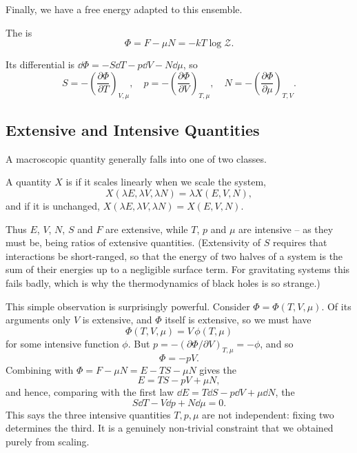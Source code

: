 \documentclass[a4paper]{scrartcl}
\begin{document}
Finally, we have a free energy adapted to this ensemble.

\begin{definition}
	The  is
	$$
	\Phi = F - \mu N = -kT\log\mathcal Z.
	$$
\end{definition}

Its differential is $\dd\Phi = -S\dd T - p\dd V - N\dd\mu$, so
$$
S = -\left(\frac{\partial\Phi}{\partial T}\right)_{V,\mu},\quad p = -\left(\frac{\partial \Phi}{\partial V}\right)_{T,\mu}, \quad N = -\left(\frac{\partial\Phi}{\partial\mu}\right)_{T,V}.
$$

\subsection{Extensive and Intensive Quantities}

A macroscopic quantity generally falls into one of two classes.

\begin{definition}
	A quantity $X$ is  if it scales linearly when we scale the system,
	$$
	X(\lambda E, \lambda V, \lambda N) = \lambda X(E,V,N),
	$$
	and  if it is unchanged, $X(\lambda E, \lambda V, \lambda N) = X(E,V,N)$.
\end{definition}

Thus $E$, $V$, $N$, $S$ and $F$ are extensive, while $T$, $p$ and $\mu$ are intensive -- as they must be, being ratios of extensive quantities. (Extensivity of $S$ requires that interactions be short-ranged, so that the energy of two halves of a system is the sum of their energies up to a negligible surface term. For gravitating systems this fails badly, which is why the thermodynamics of black holes is so strange.)

This simple observation is surprisingly powerful. Consider $\Phi = \Phi(T,V,\mu)$. Of its arguments only $V$ is extensive, and $\Phi$ itself is extensive, so we must have
$$
\Phi(T,V,\mu) = V \, \phi(T,\mu)
$$
for some intensive function $\phi$. But $p = -(\partial \Phi/\partial V)_{T,\mu} = -\phi$, and so
$$
\Phi = -pV.
$$
Combining with $\Phi = F - \mu N = E - TS - \mu N$ gives the 
$$
E = TS - pV + \mu N,
$$
and hence, comparing with the first law $\dd E = T\dd S - p\dd V + \mu\dd N$, the 
$$
S\dd T - V \dd p + N\dd\mu = 0.
$$
This says the three intensive quantities $T, p, \mu$ are not independent: fixing two determines the third. It is a genuinely non-trivial constraint that we obtained purely from scaling.
\end{document}
